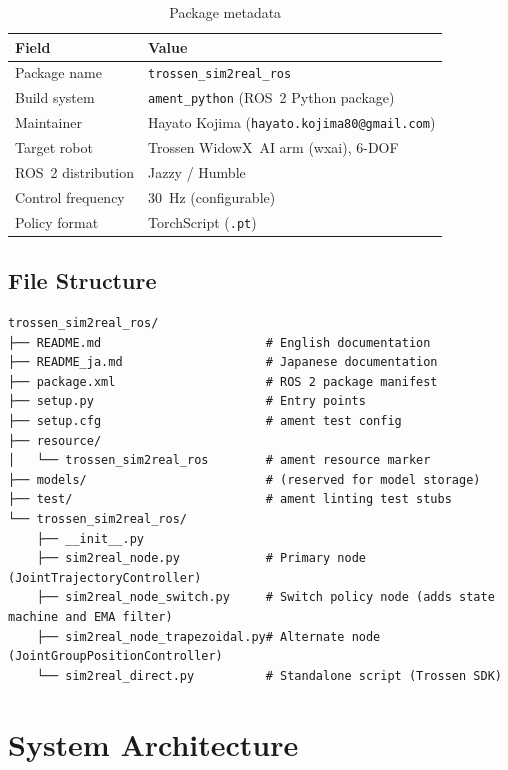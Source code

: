 \documentclass[12pt, a4paper]{article}
\begin{document}
\begin{table}[h]
\centering
\caption{Package metadata}
\label{tab:meta}
\begin{tabular}{ll}
\toprule
\textbf{Field} & \textbf{Value} \\
\midrule
Package name       & \texttt{trossen\_sim2real\_ros} \\
Build system       & \texttt{ament\_python} (ROS~2 Python package) \\
Maintainer         & Hayato Kojima (\texttt{hayato.kojima80@gmail.com}) \\
Target robot       & Trossen WidowX~AI arm (wxai), 6-DOF \\
ROS~2 distribution & Jazzy / Humble \\
Control frequency  & 30~Hz (configurable) \\
Policy format      & TorchScript (\texttt{.pt}) \\
\bottomrule
\end{tabular}
\end{table}

\subsection{File Structure}
\label{ssec:structure}

\begin{lstlisting}[caption={Repository layout of \texttt{trossen\_sim2real\_ros}},
                   label={lst:structure}]
trossen_sim2real_ros/
├── README.md                       # English documentation
├── README_ja.md                    # Japanese documentation
├── package.xml                     # ROS 2 package manifest
├── setup.py                        # Entry points
├── setup.cfg                       # ament test config
├── resource/
│   └── trossen_sim2real_ros        # ament resource marker
├── models/                         # (reserved for model storage)
├── test/                           # ament linting test stubs
└── trossen_sim2real_ros/
    ├── __init__.py
    ├── sim2real_node.py            # Primary node (JointTrajectoryController)
    ├── sim2real_node_switch.py     # Switch policy node (adds state machine and EMA filter)
    ├── sim2real_node_trapezoidal.py# Alternate node (JointGroupPositionController)
    └── sim2real_direct.py          # Standalone script (Trossen SDK)
\end{lstlisting}

\section{System Architecture}
\label{sec:architecture}
\end{document}

